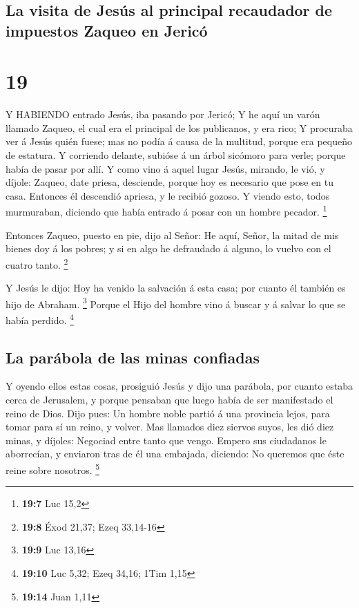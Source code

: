 \hypertarget{la-visita-de-jesuxfas-al-principal-recaudador-de-impuestos-zaqueo-en-jericuxf3}{%
\subsection{La visita de Jesús al principal recaudador de impuestos
Zaqueo en
Jericó}\label{la-visita-de-jesuxfas-al-principal-recaudador-de-impuestos-zaqueo-en-jericuxf3}}

\hypertarget{section-18}{%
\section{19}\label{section-18}}

 Y HABIENDO entrado Jesús, iba pasando por Jericó;
 Y he aquí un varón llamado Zaqueo, el cual era el principal
de los publicanos, y era rico;  Y procuraba ver á Jesús
quién fuese; mas no podía á causa de la multitud, porque era pequeño de
estatura.  Y corriendo delante, subióse á un árbol sicómoro
para verle; porque había de pasar por allí.  Y como vino á
aquel lugar Jesús, mirando, le vió, y díjole: Zaqueo, date priesa,
desciende, porque hoy es necesario que pose en tu casa. 
Entonces él descendió apriesa, y le recibió gozoso.  Y
viendo esto, todos murmuraban, diciendo que había entrado á posar con un
hombre pecador. \footnote{\textbf{19:7} Luc 15,2}

 Entonces Zaqueo, puesto en pie, dijo al Señor: He aquí,
Señor, la mitad de mis bienes doy á los pobres; y si en algo he
defraudado á alguno, lo vuelvo con el cuatro tanto. \footnote{\textbf{19:8}
  Éxod 21,37; Ezeq 33,14-16}

 Y Jesús le dijo: Hoy ha venido la salvación á esta casa;
por cuanto él también es hijo de Abraham. \footnote{\textbf{19:9} Luc
  13,16}  Porque el Hijo del hombre vino á buscar y á
salvar lo que se había perdido. \footnote{\textbf{19:10} Luc 5,32; Ezeq
  34,16; 1Tim 1,15}

\hypertarget{la-paruxe1bola-de-las-minas-confiadas}{%
\subsection{La parábola de las minas
confiadas}\label{la-paruxe1bola-de-las-minas-confiadas}}

 Y oyendo ellos estas cosas, prosiguió Jesús y dijo una
parábola, por cuanto estaba cerca de Jerusalem, y porque pensaban que
luego había de ser manifestado el reino de Dios.  Dijo
pues: Un hombre noble partió á una provincia lejos, para tomar para sí
un reino, y volver.  Mas llamados diez siervos suyos, les
dió diez minas, y díjoles: Negociad entre tanto que vengo. 
Empero sus ciudadanos le aborrecían, y enviaron tras de él una embajada,
diciendo: No queremos que éste reine sobre nosotros. \footnote{\textbf{19:14}
  Juan 1,11}

